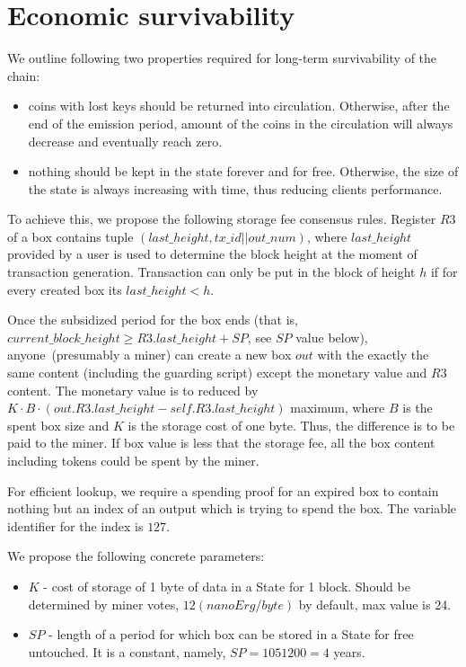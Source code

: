 \section{Economic survivability}

We outline following two properties required for long-term survivability of the chain:

\begin{itemize}
    \item{} coins with lost keys should be returned into circulation.
    Otherwise, after the end of the emission period, amount of the coins
    in the circulation will always decrease and eventually reach zero.
    \item{} nothing should be kept in the state forever and for free.
    Otherwise, the size of the state is always increasing with time, thus reducing clients performance.
\end{itemize}

To achieve this, we propose the following storage fee consensus rules.
Register $R3$ of a box contains tuple $(last\_height, tx\_id || out\_num)$, where $last\_height$ provided by a user
is used to determine the block height at the moment of transaction generation.
Transaction can only be put in the block of height $h$ if for every created box its $last\_height < h$.

Once the subsidized period for the box ends (that is,
$current\_block\_height \ge R3.last\_height + SP$, see $SP$ value below), anyone~(presumably a miner) can
create a new box $out$ with the exactly the same content (including the guarding
script) except the monetary value and $R3$ content. The monetary value is to
reduced by $K \cdot B \cdot (out.R3.last\_height - self.R3.last\_height)$ maximum, where $B$ is the spent box size and $K$ is the storage cost of one byte.
Thus, the difference is to be paid to the miner.
If box value is less that the storage fee, all the box content including tokens could be spent by the miner.

For efficient lookup, we require a spending proof for an expired box to contain nothing but an index of an
output which is trying to spend the box. The variable identifier for the index is $127$.


We propose the following concrete parameters:
\begin{itemize}
    \item{} $K$ - cost of storage of 1 byte of data in a State for 1 block.
    Should be determined by miner votes, $12 (nanoErg/byte)$ by default, max value is 24.
    \item{} $SP$ - length of a period for which box can be stored in a State for free untouched.
    It is a constant, namely, $SP = 1051200 = 4$ years.
\end{itemize}